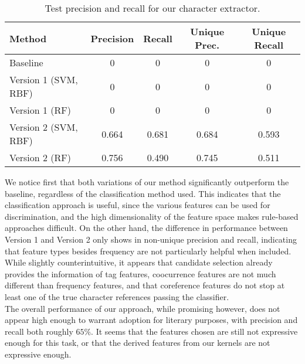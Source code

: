 \documentclass[12pt]{article}
\begin{document}
        \begin{table}[H]
        \begin{center}
            \begin{tabular}{l|c|c|c|c}
                \textbf{Method} & \textbf{Precision} & \textbf{Recall} & \textbf{Unique Prec.} & \textbf{Unique Recall} \\
                \hline
                Baseline & 0 & 0 & 0 & 0 \\
                \hline
                Version 1 (SVM, RBF) & 0 & 0 & 0 & 0 \\
                \hline
                Version 1 (RF) & 0 & 0 & 0 & 0 \\
                \hline
                Version 2 (SVM, RBF) & 0.664 & 0.681 & 0.684 & 0.593 \\
                \hline
                Version 2 (RF) & 0.756 & 0.490 & 0.745 & 0.511  
                
            \end{tabular}
        \end{center}
        \caption{Test precision and recall for our character extractor.}
        \end{table}
        We notice first that both variations of our method significantly outperform the baseline, regardless
        of the classification method used. This indicates that the classification approach is useful,
        since the various features can be used for discrimination, and the high dimensionality of the feature
        space makes rule-based approaches difficult. On the other hand, the difference in performance
        between Version 1 and Version 2 only shows in non-unique precision and recall, indicating that
        feature types besides frequency are not particularly helpful when included. While slightly
        counterintuitive, it appears that candidate selection already provides the information of tag
        features, coocurrence features are not much different than frequency features, and that coreference
        features do not stop at least one of the true character references passing the classifier. \\

        The overall performance of our approach, while promising however, does not appear high enough to warrant
        adoption for literary purposes, with precision and recall both roughly $65\%$. It seems 
        that the features chosen are still not expressive enough for this task, or that the derived features
        from our kernels are not expressive enough. \\
\end{document}
